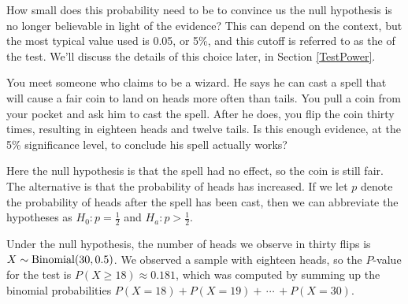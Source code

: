 How small does this probability need to be to convince us the null hypothesis is no longer believable in light of the evidence? This can depend on the context, but the most typical value used is 0.05, or 5\%, and this cutoff is referred to as the  of the test. We'll discuss the details of this choice later, in Section \ref{TestPower}.

\begin{example}\label{MagicCoinEx}
You meet someone who claims to be a wizard. He says he can cast a spell that will cause a fair coin to land on heads more often than tails. You pull a coin from your pocket and ask him to cast the spell. After he does, you flip the coin thirty times, resulting in eighteen heads and twelve tails. Is this enough evidence, at the 5\% significance level, to conclude his spell actually works?

Here the null hypothesis is that the spell had no effect, so the coin is still fair. The alternative is that the probability of heads has increased. If we let $p$ denote the probability of heads after the spell has been cast, then we can abbreviate the hypotheses as $H_0: p = \frac{1}{2}$ and $H_a: p > \frac{1}{2}$. 

Under the null hypothesis, the number of heads we observe in thirty flips is $X \sim \operatorname{Binomial}(30,0.5)$. We observed a sample with eighteen heads, so the $P$-value for the test is $P(X \geq 18) \approx 0.181$, which was computed by summing up the binomial probabilities $P(X = 18) + P(X = 19) + \,\cdots\, + P(X = 30)$.

\begin{center}
\end{center}
\end{example}
